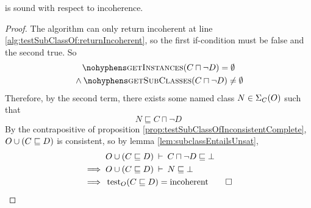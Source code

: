 \documentclass[paper.tex]{subfiles}
\begin{document}
\begin{proposition}
  \label{prop:testSubClassOfIncoherentSound}
   is sound with respect to incoherence.
\end{proposition}
\begin{proof}
  The algorithm can only return incoherent at line \ref{alg:testSubClassOf:returnIncoherent}, so the first if-condition must be false and the second true.  So
  \begin{multline*}
    \textproc{getInstances}(C \sqcap \neg D) = \emptyset \\
    {} \land \textproc{getSubClasses}(C \sqcap \neg D) \ne \emptyset
  \end{multline*}
  Therefore, by the second term, there exists some named class $N \in \Sigma_C(O)$ such that
  \[ N \sqsubseteq C \sqcap \neg D \]
  By the contrapositive of proposition \ref{prop:testSubClassOfInconsistentComplete}, $O \cup (C \sqsubseteq D)$ is consistent, so by lemma \ref{lem:subclassEntailsUnsat},
  \begin{align*}
    & O \cup (C \sqsubseteq D) \:\vdash\: C \sqcap \neg D \sqsubseteq \bot \\
    \implies{}& O \cup (C \sqsubseteq D) \:\vdash\: N \sqsubseteq \bot \\
    \implies{}& \operatorname{test}_O(C \sqsubseteq D) = \mathrm{incoherent}
    \qed
  \end{align*}
\end{proof}
\end{document}
